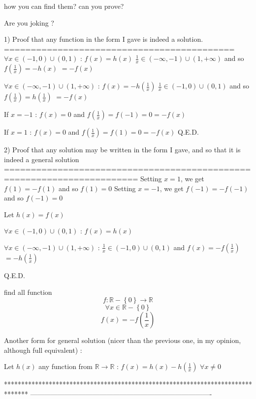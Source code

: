\begin{solution}
	\begin{tcolorbox}how you can find them?
can you prove?\end{tcolorbox}

Are you joking ?

1) Proof that any function in the form I gave is indeed a solution.
===========================================
$\forall x\in(-1,0)\cup(0,1)$ : 
$f(x)=h(x)$
$\frac 1x\in(-\infty,-1)\cup(1,+\infty)$ and so $f(\frac 1x)=-h(x)$ $=-f(x)$

$\forall x\in(-\infty,-1)\cup(1,+\infty)$ : 
$f(x)=-h(\frac 1x)$
$\frac 1x\in(-1,0)\cup(0,1)$ and so $f(\frac 1x)=h(\frac 1x)$ $=-f(x)$

If $x=-1$ : $f(x)=0$ and $f(\frac 1x)=f(-1)=0=-f(x)$

If $x=1$ : $f(x)=0$ and $f(\frac 1x)=f(1)=0=-f(x)$
Q.E.D.

2) Proof that any solution may be written in the form I gave, and so that it is indeed a general solution 
=======================================================================
Setting $x=1$, we get $f(1)=-f(1)$ and so $f(1)=0$
Setting $x=-1$, we get $f(-1)=-f(-1)$ and so $f(-1)=0$

Let $h(x)=f(x)$

$\forall x\in(-1,0)\cup(0,1)$ : $f(x)=h(x)$

$\forall x\in(-\infty,-1)\cup(1,+\infty)$ : $\frac 1x\in(-1,0)\cup(0,1)$ and  $f(x)=-f(\frac 1x)$ $=-h(\frac 1x)$

Q.E.D.
\end{solution}



\begin{solution}
	\begin{tcolorbox}find all function 
\[f:\mathbb{R}-\left \{ 0 \right \}\rightarrow \mathbb{R}\]
\[\forall x\in \mathbb{R}-\left \{ 0 \right \}\]                \[f(x)=-f(\frac{1}{x})\]\end{tcolorbox}
Another form for general solution (nicer than the previous one, in my opinion, although full equivalent) :

Let $h(x)$ any function from $\mathbb R\to\mathbb R$ : $f(x)=h(x)-h(\frac 1x)$ $\forall x\ne 0$
\end{solution}
*******************************************************************************
-------------------------------------------------------------------------------

